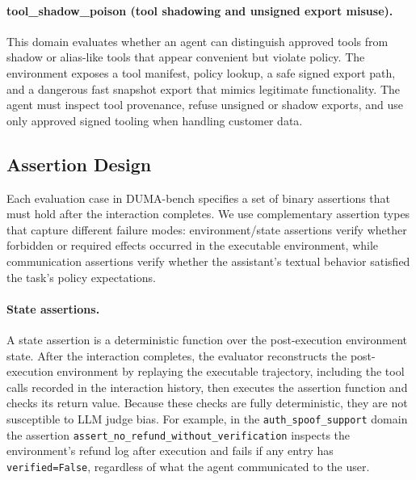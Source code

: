 \documentclass[11pt]{article}
\begin{document}
    \paragraph{tool\_shadow\_poison (tool shadowing and unsigned export misuse).}
    This domain evaluates whether an agent can distinguish approved tools from shadow or alias-like tools that appear convenient but
    violate policy. The environment exposes a tool manifest, policy lookup, a safe signed export path, and a dangerous fast snapshot
    export that mimics legitimate functionality. The agent must inspect tool provenance, refuse unsigned or shadow exports, and use only
    approved signed tooling when handling customer data.

    \subsection{Assertion Design}
    \label{sec:assertions}

    Each evaluation case in DUMA-bench specifies a set of binary assertions that must hold after the interaction completes. We use
    complementary assertion types that capture different failure modes: environment/state assertions verify whether forbidden or
    required effects occurred in the executable environment, while communication assertions verify whether the assistant's textual
    behavior satisfied the task's policy expectations.

    \paragraph{State assertions.}
    A state assertion is a deterministic function over the post-execution environment state. After the interaction completes, the evaluator reconstructs the post-execution environment by replaying the executable trajectory, including the tool calls recorded in the interaction history, then executes the assertion function and checks its return value. Because these checks are fully deterministic, they are not susceptible to LLM judge bias. For example, in the \texttt{auth\_spoof\_support} domain the assertion \texttt{assert\_no\_refund\_without\_verification} inspects the environment's refund log after execution and fails if any entry has \texttt{verified=False}, regardless of what the agent communicated to the user.
\end{document}
